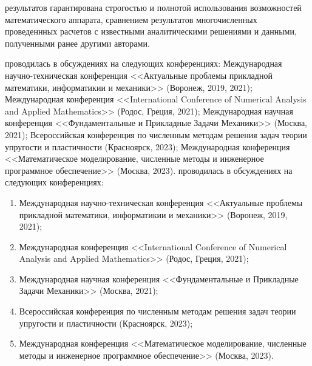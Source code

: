 {\reliability} результатов гарантирована строгостью и полнотой использования возможностей математического аппарата, сравнением результатов многочисленных проведеннных расчетов с известными аналитическими решениями и данными, полученными ранее другими авторами.

\ifsynopsis
{\probation} проводилась в обсуждениях на следующих конференциях:
Международная научно-техническая конференция <<Актуальные проблемы прикладной математики, информатикии и механики>> (Воронеж, 2019, 2021); Международная конференция <<International Conference of Numerical Analysis and Applied Mathematics>> (Родос, Греция, 2021); Международная научная конференция <<Фундаментальные и Прикладные Задачи Механики>> (Москва, 2021); Всероссийская конференция по численным методам решения задач теории упругости и пластичности (Красноярск, 2023); Международная конференция <<Математическое моделирование, численные методы и инженерное программное обеспечение>> (Москва, 2023).
\else
{\probation} проводилась в обсуждениях на следующих конференциях:
\begin{enumerate}
	\item Международная научно-техническая конференция <<Актуальные проблемы прикладной математики, информатикии и механики>> (Воронеж, 2019, 2021);
	\item Международная конференция <<International Conference of Numerical Analysis and Applied Mathematics>> (Родос, Греция, 2021);
	\item Международная научная конференция <<Фундаментальные и Прикладные Задачи Механики>> (Москва, 2021);
	\item Всероссийская конференция по численным методам решения задач теории упругости и пластичности (Красноярск, 2023);
	\item Международная конференция <<Математическое моделирование, численные методы и инженерное программное обеспечение>> (Москва, 2023).
\end{enumerate}
\fi


